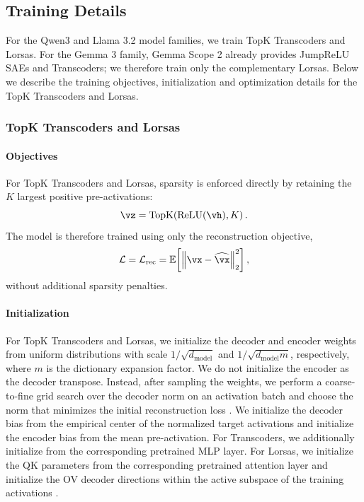 \documentclass{article}
\begin{document}
\subsection{Training Details}

For the Qwen3 and Llama 3.2 model families, we train TopK Transcoders and
Lorsas. For the Gemma 3 family, Gemma Scope 2 already provides JumpReLU SAEs
and Transcoders; we therefore train only the complementary Lorsas. Below we describe 
the training objectives, initialization and optimization details for the TopK 
Transcoders and Lorsas.

\subsubsection{TopK Transcoders and Lorsas}
\label{sec:topk_transcoder_lorsa}

\paragraph{Objectives} For TopK Transcoders and Lorsas, sparsity is enforced directly by
retaining the $K$ largest positive pre-activations:
\begin{equation}
    \vz
    =
    \operatorname{TopK}\!\left(
        \operatorname{ReLU}(\vh), K
    \right).
\end{equation}
The model is therefore trained using only the reconstruction objective,
\begin{equation}
    \mathcal{L}
    =
    \mathcal{L}_{\mathrm{rec}}
    =
    \mathbb{E}\!\left[
        \left\|
        \vx-\widehat{\vx}
        \right\|_2^2
    \right],
\end{equation}
without additional sparsity penalties.

\paragraph{Initialization}
For TopK Transcoders and Lorsas, we initialize the decoder and encoder weights
from uniform distributions with scale $1/\sqrt{d_{\mathrm{model}}}$ and
$1/\sqrt{d_{\mathrm{model}}m}$, respectively, where $m$ is the dictionary
expansion factor. We do not initialize the encoder as the decoder transpose.
Instead, after sampling the weights, we perform a coarse-to-fine grid search
over the decoder norm on an activation batch and choose the norm that
minimizes the initial reconstruction loss \citep{gao2024topk}. We initialize the decoder bias from
the empirical center of the normalized target activations and initialize the
encoder bias from the mean pre-activation. For Transcoders, we additionally
initialize from the corresponding pretrained MLP layer. For Lorsas, we
initialize the QK parameters from the corresponding pretrained attention layer
and initialize the OV decoder directions within the active subspace of the
training activations \citep{wang2026dimensional}.
\end{document}
